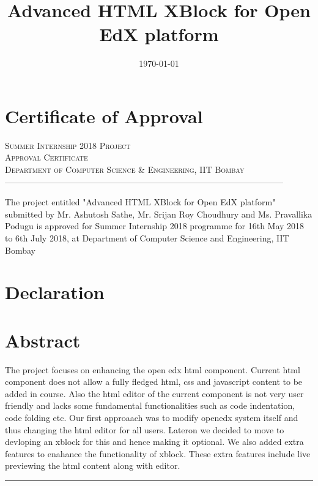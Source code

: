 \documentclass[a4paper, twosided, openany]{memoir}
\begin{document}
\pagestyle{plain}
\title{Advanced HTML XBlock for Open EdX platform}
\date{\today}

\frontmatter


\chapter*{Certificate of Approval}

\begin{center}
\textsc{\LARGE Summer Internship 2018 Project}\\
\bigskip
\textsc{\Large Approval Certificate}\\
\bigskip
\textsc{ Department of Computer Science \& Engineering, IIT Bombay}\\
\textsc{--------------------------------------------------------------------------------------------------}\\
\bigskip\bigskip\bigskip\bigskip\bigskip\bigskip

The project entitled "Advanced HTML XBlock for Open EdX platform" submitted by Mr. Ashutosh Sathe, Mr. Srijan Roy Choudhury and Ms. Pravallika Podugu is approved for Summer Internship 2018 programme for 16th May 2018 to 6th July 2018, at Department of Computer Science and Engineering, IIT Bombay
\end{center}

\chapter*{Declaration}
\begin{center}

\end{center}

\chapter*{Abstract}
The project focuses on enhancing the open edx html component. Current html component does not
allow a fully fledged html, css and javascript content to be added in course. Also the html editor of
the current component is not very user friendly and lacks some fundamental functionalities such as
code indentation, code folding etc. Our first approaach was to modify openedx system itself and
thus changing the html editor for all users. Lateron we decided to move to devloping an xblock for
this and hence making it optional. We also added extra features to enahance the functionality of
xblock. These extra features include live previewing the html content along with editor.\newline
\par\fancybreak{$***$}\par
\end{document}
